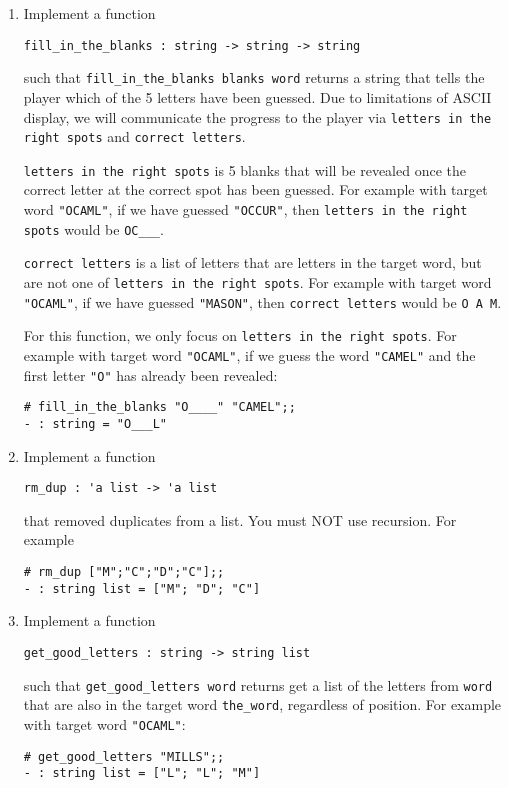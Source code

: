 \documentclass{article}
\newcommand{\code}[1]{\lstinline!#1!}
\begin{document}
\begin{enumerate}
 
\item  Implement a function
  \begin{center}
    \code{fill_in_the_blanks : string -> string -> string}
  \end{center}
such that \code{fill_in_the_blanks blanks word} returns a string that tells the player which of the 5 letters have been guessed. Due to limitations of ASCII display, we will communicate the progress to the player via \code{letters in the right spots} and \code{correct letters}. 

\code{letters in the right spots} is 5 blanks that will be revealed once the correct letter at the correct spot has been guessed. For example with target word \code{"OCAML"}, if we have guessed \code{"OCCUR"}, then \code{letters in the right spots} would be \code{OC___}.

\code{correct letters} is a list of letters that are letters in the target word, but are not one of \code{letters in the right spots}. For example with target word \code{"OCAML"}, if we have guessed \code{"MASON"}, then \code{correct letters} would be \code{O A M}.  

For this function, we only focus on \code{letters in the right spots}.
For example with target word \code{"OCAML"}, if we guess the word \code{"CAMEL"} and the first letter \code{"O"} has already been revealed:
\begin{lstlisting}
# fill_in_the_blanks "O____" "CAMEL";;
- : string = "O___L"
\end{lstlisting}


\item Implement a function

  \begin{center}
    \code{rm_dup : 'a list -> 'a list}
  \end{center}
that removed duplicates from a list. You must NOT use recursion. For example
\begin{lstlisting}
# rm_dup ["M";"C";"D";"C"];;
- : string list = ["M"; "D"; "C"]
\end{lstlisting}
 

\item Implement a function

  \begin{center}
    \code{get_good_letters : string -> string list}
  \end{center}
such that \code{get_good_letters word} returns get a list of the letters from \code{word} that are also in the target word \code{the_word}, regardless of position. For example with target word \code{"OCAML"}:
\begin{lstlisting}
# get_good_letters "MILLS";;
- : string list = ["L"; "L"; "M"]
\end{lstlisting}



\end{enumerate}
\end{document}
